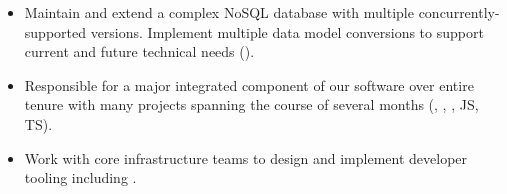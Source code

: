 \begin{position}
  \medskip

\begin{itemize}
  \def\importantpoint{{\large$\star$\hspace*{-1pt}}}
\item Maintain and extend a complex NoSQL database with multiple
  concurrently-supported versions.  Implement multiple data model
  conversions to support current and future technical needs
  ().
\item Responsible for a major integrated component of our software
  over entire tenure \Dash with many projects spanning the course of
  several months (, , \CSharp, JS, TS).
\item Work with core infrastructure teams to design and implement
  developer tooling \Dash including .
\end{itemize}
\end{position}

